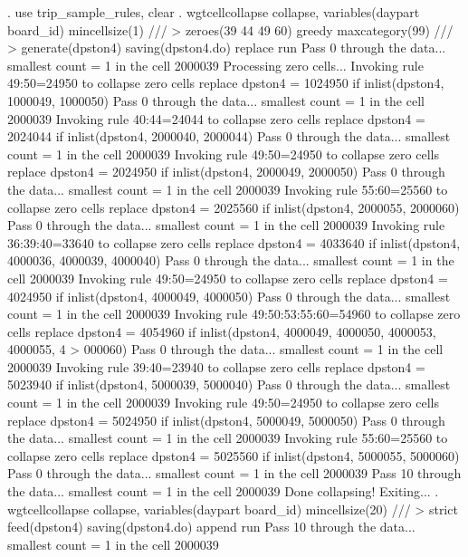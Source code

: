 . use trip_sample_rules, clear
{\smallskip}
. wgtcellcollapse collapse, variables(daypart board_id) mincellsize(1) ///
>         zeroes(39 44 49 60) greedy maxcategory(99) ///
>         generate(dpston4) saving(dpston4.do) replace run
Pass 0 through the data...
  smallest count = 1 in the cell      2000039
{\smallskip}
Processing zero cells...
{\smallskip}
  Invoking rule 49:50=24950 to collapse zero cells
  replace dpston4 = 1024950 if inlist(dpston4, 1000049, 1000050)
Pass 0 through the data...
  smallest count = 1 in the cell      2000039
  Invoking rule 40:44=24044 to collapse zero cells
  replace dpston4 = 2024044 if inlist(dpston4, 2000040, 2000044)
Pass 0 through the data...
  smallest count = 1 in the cell      2000039
  Invoking rule 49:50=24950 to collapse zero cells
  replace dpston4 = 2024950 if inlist(dpston4, 2000049, 2000050)
Pass 0 through the data...
  smallest count = 1 in the cell      2000039
  Invoking rule 55:60=25560 to collapse zero cells
  replace dpston4 = 2025560 if inlist(dpston4, 2000055, 2000060)
Pass 0 through the data...
  smallest count = 1 in the cell      2000039
  Invoking rule 36:39:40=33640 to collapse zero cells
  replace dpston4 = 4033640 if inlist(dpston4, 4000036, 4000039, 4000040)
Pass 0 through the data...
  smallest count = 1 in the cell      2000039
  Invoking rule 49:50=24950 to collapse zero cells
  replace dpston4 = 4024950 if inlist(dpston4, 4000049, 4000050)
Pass 0 through the data...
  smallest count = 1 in the cell      2000039
  Invoking rule 49:50:53:55:60=54960 to collapse zero cells
  replace dpston4 = 4054960 if inlist(dpston4, 4000049, 4000050, 4000053, 4000055, 4
> 000060)
Pass 0 through the data...
  smallest count = 1 in the cell      2000039
  Invoking rule 39:40=23940 to collapse zero cells
  replace dpston4 = 5023940 if inlist(dpston4, 5000039, 5000040)
Pass 0 through the data...
  smallest count = 1 in the cell      2000039
  Invoking rule 49:50=24950 to collapse zero cells
  replace dpston4 = 5024950 if inlist(dpston4, 5000049, 5000050)
Pass 0 through the data...
  smallest count = 1 in the cell      2000039
  Invoking rule 55:60=25560 to collapse zero cells
  replace dpston4 = 5025560 if inlist(dpston4, 5000055, 5000060)
Pass 0 through the data...
  smallest count = 1 in the cell      2000039
Pass 10 through the data...
  smallest count = 1 in the cell      2000039
  Done collapsing! Exiting...
{\smallskip}
. wgtcellcollapse collapse, variables(daypart board_id) mincellsize(20) ///
>         strict feed(dpston4) saving(dpston4.do) append run
Pass 10 through the data...
  smallest count = 1 in the cell      2000039
